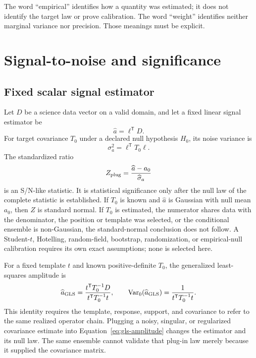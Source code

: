 \documentclass[11pt]{article}
\newcommand{\Var}{\operatorname{Var}}
\begin{document}
The word ``empirical'' identifies how a quantity was estimated; it does not
identify the target law or prove calibration.  The word ``weight'' identifies
neither marginal variance nor precision.  Those meanings must be explicit.

\section{Signal-to-noise and significance}

\subsection{Fixed scalar signal estimator}

Let $D$ be a science data vector on a valid domain, and let a fixed linear
signal estimator be
\begin{equation}
  \widehat a=\ell^{\mathsf T}D.
  \label{eq:linear-amplitude}
\end{equation}
For target covariance $T_0$ under a declared null hypothesis $H_0$, its noise
variance is
\begin{equation}
  \sigma_a^2=\ell^{\mathsf T}T_0\ell.
  \label{eq:linear-amplitude-variance}
\end{equation}
The standardized ratio
\begin{equation}
  Z_{\rm plug}=\frac{\widehat a-a_0}{\widehat\sigma_a}
  \label{eq:plugin-standard-score}
\end{equation}
is an S/N-like statistic.  It is statistical significance only after the
null law of the complete statistic is established.  If $T_0$ is known and
$\widehat a$ is Gaussian with null mean $a_0$, then $Z$ is standard normal.
If $T_0$ is estimated, the numerator shares data with the denominator, the
position or template was selected, or the conditional ensemble is non-Gaussian,
the standard-normal conclusion does not follow.  A Student-$t$, Hotelling,
random-field, bootstrap, randomization, or empirical-null calibration requires
its own exact assumptions; none is selected here.

For a fixed template $t$ and known positive-definite $T_0$, the generalized
least-squares amplitude is
\begin{equation}
  \widehat a_{\rm GLS}
  =\frac{t^{\mathsf T}T_0^{-1}D}
         {t^{\mathsf T}T_0^{-1}t},
  \qquad
  \Var_0(\widehat a_{\rm GLS})
  =\frac{1}{t^{\mathsf T}T_0^{-1}t}.
  \label{eq:gls-amplitude}
\end{equation}
This identity requires the template, response, support, and covariance to
refer to the same realized operator chain.  Plugging a noisy, singular, or
regularized covariance estimate into Equation~\eqref{eq:gls-amplitude}
changes the estimator and its null law.  The same ensemble cannot validate
that plug-in law merely because it supplied the covariance matrix.
\end{document}
